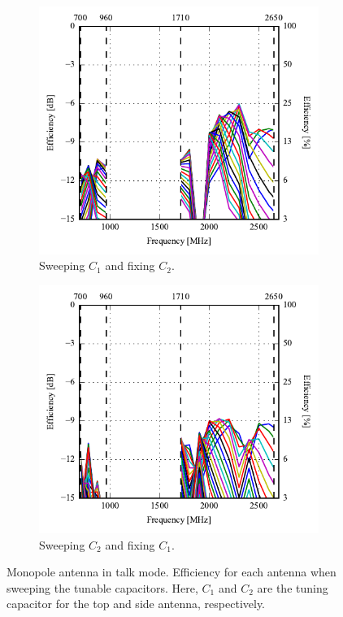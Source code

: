\begin{figure}[htbp]
    \centering
    \begin{subfigure}{0.49\linewidth}
        \includegraphics{img/tech_sol/monopole/highband/ue/talkmode/eff_top.pdf}
        \caption{Sweeping $C_1$ and fixing $C_2$.}
    \end{subfigure}
    \hfill
    \begin{subfigure}{0.49\linewidth}
        \includegraphics{img/tech_sol/monopole/highband/ue/talkmode/eff_side.pdf}
        \caption{Sweeping $C_2$ and fixing $C_1$.}
    \end{subfigure}
    \caption{Monopole antenna in talk mode. Efficiency for each antenna when sweeping the tunable capacitors. Here, $C_1$ and $C_2$ are the tuning capacitor for the top and side antenna, respectively.}
    \label{fig:eff_mono_modi_talk_mode}
\end{figure}

